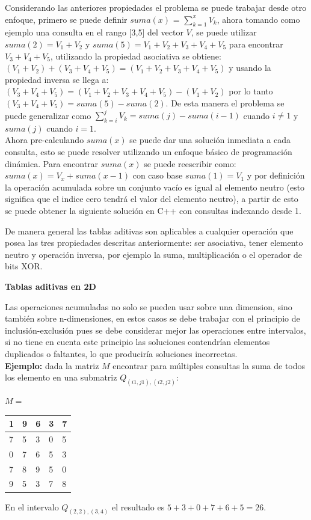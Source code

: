 \documentclass[12pt, a4paper]{article}
\newcommand\cppfile[2][]{

}
\newcommand{\subtitulo}[1]{\begin{center}\textbf{#1}\end{center}}
\begin{document}
	Considerando las anteriores propiedades el problema se puede trabajar desde otro enfoque, primero se puede
	definir $suma(x)$ = $\sum_{k=1}^{x} V_{k}$, ahora tomando como ejemplo una consulta en el rango [3,5] 
	del vector $V$, se puede utilizar $suma(2) = V_{1}+V_{2}$ y $suma(5) = V_{1}+V_{2}+V_{3}+V_{4}+V_{5}$ para
	encontrar $V_{3}+V_{4}+V_{5}$, utilizando la propiedad asociativa se obtiene: 
	$(V_{1}+V_{2})+(V_{3}+V_{4}+V_{5})=(V_{1}+V_{2}+V_{3}+V_{4}+V_{5})$ y usando la propiedad inversa se llega a:
	$(V_{3}+V_{4}+V_{5})=(V_{1}+V_{2}+V_{3}+V_{4}+V_{5})-(V_{1}+V_{2})$ por lo tanto 
	$(V_{3}+V_{4}+V_{5})=suma(5)-suma(2)$. De esta manera el problema se puede generalizar como 
	$\sum_{k=i}^{j} V_{k} = suma(j) - suma(i-1)$ cuando $i \neq 1$ y $suma(j)$ cuando $i=1$.\\
	
	Ahora pre-calculando $suma(x)$ se puede dar una solución inmediata a cada consulta, esto se puede resolver 
	utilizando un enfoque básico de programación dinámica. Para encontrar $suma(x)$ se puede reescribir como: 
	$suma(x) = V_{x} + suma(x-1)$ con caso base $suma(1)=V_{1}$ y por definición la operación acumulada sobre un 
	conjunto vacío es igual al elemento neutro (esto significa que el indice cero tendrá el valor del elemento 
	neutro), a partir de esto se puede obtener la siguiente solución en C++ con consultas indexando desde 1.
	\cppfile[6-14]{Estructuras_de_datos/codigos/tablas_aditivas.cpp}
	
	De manera general las tablas aditivas son aplicables a cualquier operación que posea las tres propiedades 
	descritas anteriormente: ser asociativa, tener elemento neutro y operación inversa, por ejemplo la suma,
	multiplicación o el operador de bits XOR.

	\subtitulo{Tablas aditivas en 2D}
	
	Las operaciones acumuladas no solo se pueden usar sobre una dimension, sino también sobre n-dimensiones, en estos
	casos se debe trabajar con el principio de inclusión-exclusión pues se debe considerar mejor las operaciones entre
	intervalos, si no tiene en cuenta este principio las soluciones contendrían elementos duplicados o faltantes, lo 
	que produciría soluciones incorrectas.\\
	
	\textbf{Ejemplo:} dada la matriz $M$ encontrar para múltiples consultas la suma de todos los elemento en una
	submatriz $Q_{(i1,j1),(i2,j2)}$:
	\begin{center}
		$M = $
		\begin{tabular}{|l|l|l|l|l|}
			\hline
			1  &9  &6 &3 &7\\ \hline
			7  &5  &3 &0 &5\\ \hline
			0  &7  &6 &5 &3\\ \hline
			7  &8  &9 &5 &0\\ \hline
			9  &5  &3 &7 &8\\ \hline
		\end{tabular}
	\end{center}
	En el intervalo $Q_{(2,2),(3,4)}$ el resultado es $5+3+0+7+6+5=26$.\\
\end{document}
